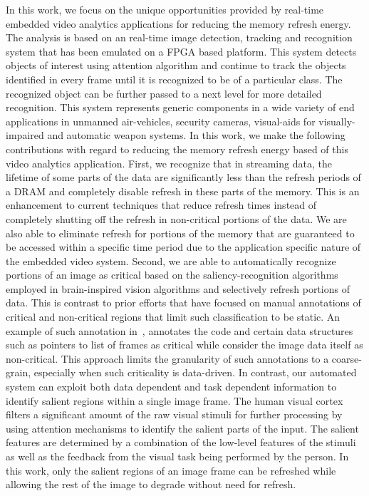 In this work, we focus on the unique opportunities provided by real-time embedded video analytics applications for reducing the memory refresh energy. The analysis is based on an real-time image detection, tracking and recognition system that has been emulated on a FPGA based platform. This system detects objects of interest using attention algorithm and continue to track the objects identified in every frame until it is recognized to be of a particular class. The recognized object can be further passed to a next level for more detailed recognition. This system represents generic components in a wide variety of end applications in unmanned air-vehicles, security cameras, visual-aids for visually-impaired and automatic weapon systems. In this work, we make the following contributions with regard to reducing the memory refresh energy based of this video analytics application.
First, we recognize that in streaming data, the lifetime of some parts of the data are significantly less than the refresh periods of a DRAM and completely disable refresh in these parts of the memory. This is an enhancement to current techniques that reduce refresh times instead of completely shutting off the refresh in non-critical portions of the data. We are also able to eliminate refresh for portions of the memory that are guaranteed to be accessed within a specific time period due to the application specific nature of the embedded video system.
Second, we are able to automatically recognize portions of an image as critical based on the saliency-recognition algorithms employed in brain-inspired vision algorithms and selectively refresh portions of data. This is contrast to prior efforts that have focused on manual annotations of critical and non-critical regions that limit such classification to be static. An example of such annotation in~\cite{Liu2011}, annotates the code and certain data structures such as pointers to list of frames as critical while consider the image data itself as non-critical. This approach limits the granularity of such annotations to a coarse-grain, especially when such criticality is data-driven. In contrast, our automated system can exploit both data dependent and task dependent information to identify salient regions within a single image frame. 
The human visual cortex filters a significant amount of the raw visual stimuli for further processing by using attention mechanisms to identify the salient parts of the input. The salient features are determined by a combination of the low-level features of the stimuli as well as the feedback from the visual task being performed by the person. In this work, only the salient regions of an image frame can be refreshed while allowing the rest of the image to degrade without need for refresh. 

